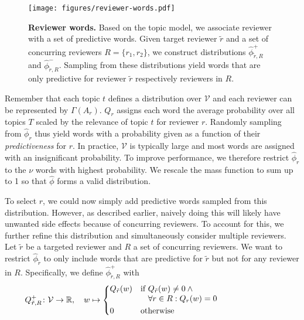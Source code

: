 \documentclass[letterpaper,twocolumn,10pt]{article}
\newcommand{\vocabulary}{\mathcal{V}}
\newcommand{\surroundingreviewers}{R}
\newcommand{\reviewer}{r}
\newcommand{\archive}{A}
\newcommand{\reviewerwordsmax}{\nu}
\newcommand{\reviewerwordsmass}{Q}
\newcommand{\reviewerwords}{\hat{\topicworddist}}
\newcommand{\topic}{t}
\newcommand{\topics}{T}
\newcommand{\topicextractor}{\Gamma}
\newcommand{\topicworddist}{\phi}
\newcommand{\word}{w}
\begin{document}
\begin{figure}[t]
    \centering
\texttt{[image: figures/reviewer-words.pdf]}
    \caption{\textbf{Reviewer words.} Based on the topic model, we associate reviewer with a set of predictive words. Given target reviewer $\tilde{\reviewer}$ and a set of concurring reviewers $\surroundingreviewers = \{\reviewer_1, \reviewer_2\}$, we construct distributions $\reviewerwords^+_{\tilde{\reviewer}, \surroundingreviewers}$ and $\reviewerwords^-_{\tilde{\reviewer}, \surroundingreviewers}$. Sampling from these distributions yield words that are only predictive for reviewer $\tilde{\reviewer}$ respectively reviewers in $\surroundingreviewers$. }
    \label{fig:reviewer-words}
  	\vspace{-0.5em}
\end{figure} 
Remember that each topic $\topic$ defines a distribution over $\vocabulary$ and each reviewer can be represented by $\topicextractor(\archive_\reviewer)$. $\reviewerwordsmass_\reviewer$ assigns each word the average probability over all topics $\topics$ scaled by the relevance of topic $\topic$ for reviewer $\reviewer$. 
Randomly sampling from $\reviewerwords_\reviewer$ thus yield words with a probability given as a function of their \emph{predictiveness} for $\reviewer$. In practice, $\vocabulary$ is typically large and most words are assigned with an {insignificant\EndAccSupp{}} probability. To improve performance, we therefore restrict $\reviewerwords_\reviewer$ to the $\reviewerwordsmax$ words with highest probability. We rescale the {mass\EndAccSupp{}} function to sum up to 1 so that $\reviewerwords$ forms a valid distribution.

To select $\reviewer$, we could now simply add predictive words sampled from this distribution. However, as described earlier, {naively\EndAccSupp{}} doing this will likely have unwanted side effects because of concurring reviewers.
To account for this, we further refine this distribution and simultaneously consider multiple reviewers. Let $\tilde{\reviewer}$ be a targeted reviewer and $\surroundingreviewers$ a set of concurring reviewers. We want to restrict $\reviewerwords_{\tilde{\reviewer}}$ to only include words that are predictive for $\tilde{\reviewer}$ but not for any reviewer in $\surroundingreviewers$. Specifically, we define $\reviewerwords^+_{\tilde{\reviewer}, \surroundingreviewers}$ with 
\[
    \reviewerwordsmass^+_{\tilde{\reviewer}, \surroundingreviewers} \colon \vocabulary \rightarrow \mathbb{R}, \quad \word \mapsto
    \begin{cases*}
        \reviewerwordsmass_{\tilde{\reviewer}}(w) &
        if \parbox[t]{5.5cm}{$\reviewerwordsmass_{\tilde{\reviewer}}(w) \neq 0 \wedge\\   
         \forall r \in \surroundingreviewers: \reviewerwordsmass_{\reviewer}(w) = 0$} \\
        0 & otherwise \\
    \end{cases*}    
\]
\end{document}
